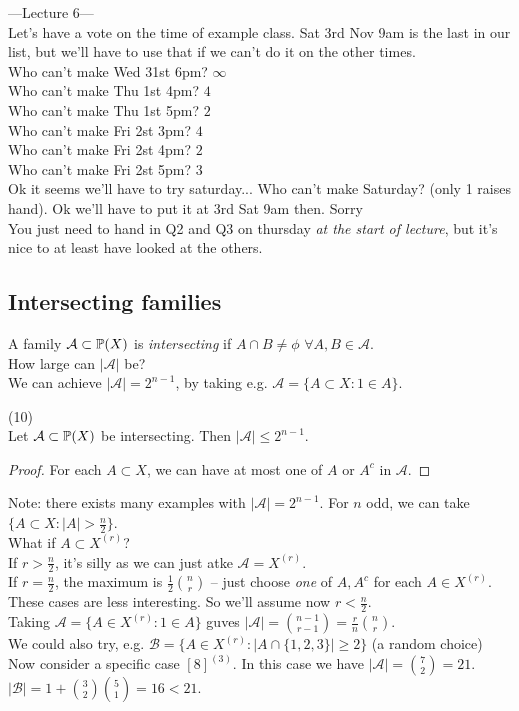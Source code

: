 \documentclass[a4paper]{article}
\begin{document}
---Lecture 6---\\
Let's have a vote on the time of example class. Sat 3rd Nov 9am is the last in our list, but we'll have to use that if we can't do it on the other times.\\
Who can't make Wed 31st 6pm? $\infty$\\
Who can't make Thu 1st 4pm? $4$\\
Who can't make Thu 1st 5pm? $2$\\
Who can't make Fri 2st 3pm? $4$\\
Who can't make Fri 2st 4pm? $2$\\
Who can't make Fri 2st 5pm? $3$\\
Ok it seems we'll have to try saturday... Who can't make Saturday? (only 1 raises hand). Ok we'll have to put it at 3rd Sat 9am then. Sorry\\
You just need to hand in Q2 and Q3 on thursday \emph{at the start of lecture}, but it's nice to at least have looked at the others.

\subsection{Intersecting families}

A family $\mathcal{A} \subset \P(X)$ is \emph{intersecting} if $A \cap B \neq \phi$ $\forall A,B \in \mathcal{A}$.\\
How large can $|\mathcal{A}|$ be?\\
We can achieve $|\mathcal{A}| = 2^{n-1}$, by taking e.g. $\mathcal{A} = \{A \subset X: 1 \in A\}$.

\begin{prop} (10)\\
    Let $\mathcal{A} \subset \P(X)$ be intersecting. Then $|\mathcal{A}| \leq 2^{n-1}$.\\
    \begin{proof}
        For each $A \subset X$, we can have at most one of $A$ or $A^c$ in $\mathcal{A}$.
    \end{proof}
\end{prop}

Note: there exists many examples with $|\mathcal{A}| = 2^{n-1}$. For $n$ odd, we can take $\{A \subset X: |A| > \frac{n}{2}\}$.\\
What if $A \subset X^{(r)}$?\\
If $r > \frac{n}{2}$, it's silly as we can just atke $\mathcal{A} = X^{(r)}$.\\
If $r = \frac{n}{2}$, the maximum is $\frac{1}{2} {n \choose r}$ -- just choose \emph{one} of $A,A^c$ for each $A \in X^{(r)}$.\\
These cases are less interesting. So we'll assume now $r<\frac{n}{2}$.\\
Taking $\mathcal{A} = \{A \in X^{(r)} : 1 \in A\}$ guves $|\mathcal{A}| = {{n-1} \choose {r-1}} =\frac{r}{n} {n \choose r}$.\\
We could also try, e.g. $\mathcal{B} = \{A \in X^{(r)}: |A \cap \{1,2,3\} | \geq 2\}$ (a random choice)\\
Now consider a specific case $[8]^{(3)}$. In this case we have $|\mathcal{A}| = {7 \choose 2} = 21$. $|\mathcal{B}| = 1+{3 \choose 2} {5 \choose 1} = 16 < 21$.
\end{document}
